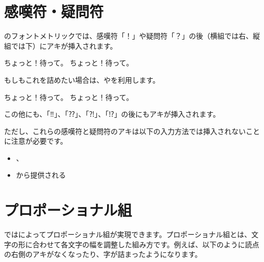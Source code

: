 \documentclass[../otf-unofficial-guide]{subfiles}
\begin{document}
\section{感嘆符・疑問符}

のフォントメトリックでは、感嘆符「{\ibmfamily ！}\hspace{-0.5zw}」や疑問符「{\ibmfamily ？}\hspace{-0.5zw}」の後（横組では右、縦組では下）にアキが挿入されます。

\begin{demosource}
{ ちょっと！\inhibitglue 待って。}
\tcblower
ちょっと！待って。
\end{demosource}

もしもこれを詰めたい場合は、や\cmd{<}を利用します。

\begin{demosource}
ちょっと！\inhibitglue{}\textvisiblespace 待って。
\tcblower
ちょっと！\inhibitglue 待って。
\end{demosource}

この他にも、「{\ibmfamily ‼}\hspace{-0.8zw}」、「{\ibmfamily ⁇}\hspace{-0.4zw}」、「{\ibmfamily ⁈}\hspace{-0.4zw}」、「{\ibmfamily ⁉}\hspace{-0.6zw}」の後にもアキが挿入されます。

ただし、これらの感嘆符と疑問符のアキは以下の入力方法では挿入されないことに注意が必要です。

\begin{itemize}
  \item {}、
  \item {}から提供される
\end{itemize}

\section{プロポーショナル組}

ではによってプロポーショナル組が実現できます。プロポーショナル組とは、文字の形に合わせて各文字の幅を調整した組み方です。例えば、以下のように読点の右側のアキがなくなったり、字が詰まったようになります。
\end{document}

